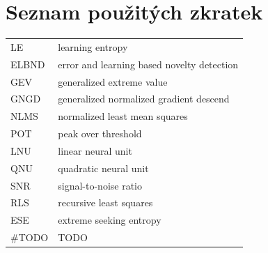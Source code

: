 \chapter*{Seznam použitých zkratek}
\begin{tabular}{ll}
LE                      & learning entropy                                  \\
ELBND                   & error and learning based novelty detection        \\
GEV                     & generalized extreme value                         \\
GNGD                    & generalized normalized gradient descend           \\
NLMS                    & normalized least mean squares                     \\
POT                     & peak over threshold                               \\
LNU                     & linear neural unit                                \\
QNU                     & quadratic neural unit                             \\
SNR                     & signal-to-noise ratio                             \\
RLS                     & recursive least squares                           \\
ESE                     & extreme seeking entropy                           \\
\#TODO                  & TODO
\end{tabular}

\cleardoublepage
\thispagestyle{empty}

